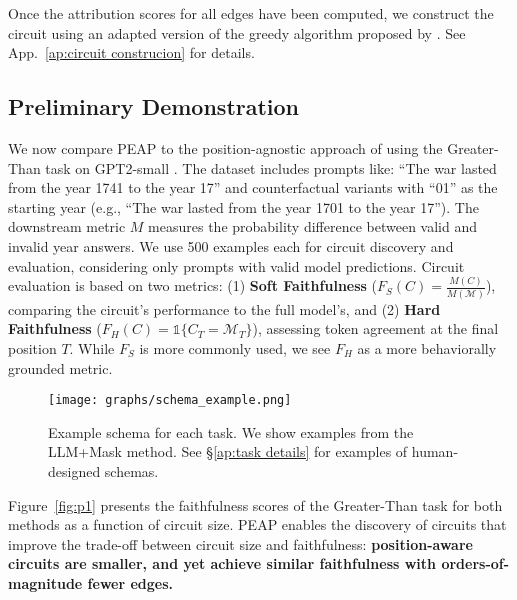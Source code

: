 Once the attribution scores for all edges have been computed, we construct the circuit using an adapted version of the greedy algorithm proposed by \citet{hanna2024have}. See App.~\ref{ap:circuit construcion} for details. 

\vspace{-2pt}
\subsection{Preliminary Demonstration}
\vspace{-2pt}
We now compare PEAP to the position-agnostic approach of \citet{syed2023attribution} using the Greater-Than task \citep{hanna2024does} on GPT2-small \citep{radford2019language}.
The dataset includes prompts like: ``The war lasted from the year 1741 to the year 17\underline{\hspace{1em}}'' and counterfactual variants with ``01'' as the starting year (e.g., ``The war lasted from the year 1701 to the year 17\underline{\hspace{1em}}'').
The downstream metric $M$ measures the probability difference between valid and invalid year answers.
We use 500 examples each for circuit discovery and evaluation, considering only prompts with valid model predictions.
Circuit evaluation is based on two metrics: (1) \textbf{Soft Faithfulness} ($F_S(C) = \frac{M(C)}{M(\mathcal{M})}$), comparing the circuit's performance to the full model's, and (2) \textbf{Hard Faithfulness} ($F_H(C) = \mathds{1}\{C_T = \mathcal{M}_T\}$), assessing token agreement at the final position $T$.
While $F_S$ is more commonly used, we see $F_H$ as a more behaviorally grounded metric.


\begin{figure*}[t]
    \centering
    \texttt{[image: graphs/schema\_example.png]}
    \caption{Example schema for each task. We show examples from the LLM+Mask method. See \S\ref{ap:task details} for examples of human-designed schemas.}
    \label{tab:schema-example}
    \vspace{-5pt}
\end{figure*}

Figure~\ref{fig:p1} presents the faithfulness scores of the Greater-Than task for both methods as a function of circuit size. PEAP enables the discovery of circuits that improve the trade-off between circuit size and faithfulness: \textbf{position-aware circuits are smaller, and yet achieve similar faithfulness with orders-of-magnitude fewer edges.}


